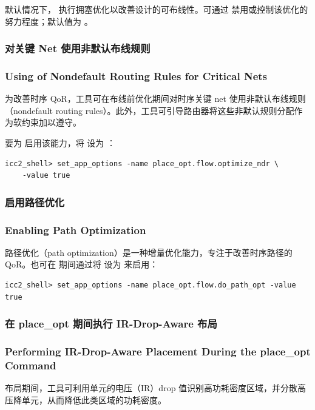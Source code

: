 默认情况下， 执行拥塞优化以改善设计的可布线性。可通过  禁用或控制该优化的努力程度；默认值为 。

\subsubsection{对关键 Net 使用非默认布线规则}
\subsubsection*{Using of Nondefault Routing Rules for Critical Nets}

为改善时序 QoR，工具可在布线前优化期间对时序关键 net 使用非默认布线规则（nondefault routing rules）。此外，工具可引导路由器将这些非默认规则分配作为软约束加以遵守。

要为  启用该能力，将  设为 ：
\begin{lstlisting}
icc2_shell> set_app_options -name place_opt.flow.optimize_ndr \
    -value true
\end{lstlisting}

\subsubsection{启用路径优化}
\subsubsection*{Enabling Path Optimization}

路径优化（path optimization）是一种增量优化能力，专注于改善时序路径的 QoR。也可在  期间通过将  设为  来启用：
\begin{lstlisting}
icc2_shell> set_app_options -name place_opt.flow.do_path_opt -value true
\end{lstlisting}

\subsubsection{在 place\_opt 期间执行 IR-Drop-Aware 布局}
\subsubsection*{Performing IR-Drop-Aware Placement During the place\_opt Command}

布局期间，工具可利用单元的电压（IR）drop 值识别高功耗密度区域，并分散高压降单元，从而降低此类区域的功耗密度。

